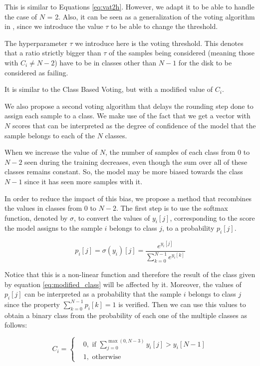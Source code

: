 This is similar to Equations \ref{eq:vat2h}.
However, we adapt it to be able to handle the case of $N$ = 2.
Also, it can be seen as a generalization of the voting algorithm in \cite{Li14}, since we introduce the value $\tau$ to be able to change the threshold.

The hyperparameter $\tau$ we introduce here is the voting threshold.
This denotes that a ratio strictly bigger than $\tau$ of the samples being considered (meaning those with $C_i \neq N-2$) have to be in classes other than $N-1$ for the disk to be considered as failing.

It is similar to the Class Based Voting, but with a modified value of $C_i$.

We also propose a second voting algorithm that delays the rounding step done to assign each sample to a class.
We make use of the fact that we get a vector with $N$ scores that can be interpreted as the degree of confidence of the model that the sample belongs to each of the $N$ classes.

When we increase the value of $N$, the number of samples of each class from $0$ to $N-2$ seen during the training decreases, even though the sum over all of these classes remains constant.
So, the model may be more biased towards the class $N-1$ since it has seen more samples with it.

In order to reduce the impact of this bias, we propose a method that recombines the values in classes from $0$ to $N-2$.
The first step is to use the softmax function, denoted by $\sigma$, to convert the values of $y_i[j]$, corresponding to the score the model assigns to the sample $i$ belongs to class $j$, to a probability $p_i[j]$.

\begin{equation}
  p_i[j] = \sigma(y_i)[j] = \dfrac{e^{y_i[j]}}{\sum_{k=0}^{N-1}e^{y_i[k]}}
\end{equation}

Notice that this is a non-linear function and therefore the result of the class given by equation \ref{eq:modified_class} will be affected by it.
Moreover, the values of $p_i[j]$ can be interpreted as a probability that the sample $i$ belongs to class $j$ since the property $\sum_{k=0}^{N-1}p_i[k] = 1$ is verified. 
Then we can use this values to obtain a binary class from the probability of each one of the multiple classes as follows:

\begin{equation}\label{eq:modified_class}
  C_i = 
  \begin{cases}
    & 0, \text{ if } \sum_{j=0}^{\max(0,N-3)} y_i[j] > y_i[N-1] \\
    & 1, \text{ otherwise}
  \end{cases}
\end{equation}

